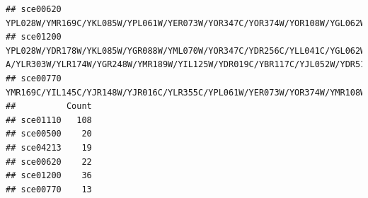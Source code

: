 \documentclass[
]{book}
\begin{document}
\begin{verbatim}
## sce00620                                                                                                                                                                                                                                                                                                                                                                                                                                                                                                                                                                                                                                                                                                                   YPL028W/YMR169C/YKL085W/YPL061W/YER073W/YOR347C/YOR374W/YOR108W/YGL062W/YML004C/YAL054C/YDL174C/YDL131W/YDR272W/YBR145W/YEL071W/YLR153C/YDL182W/YBL015W/YML054C/YGL256W/YDR533C
## sce01200                                                                                                                                                                                                                                                                                                                                                                                                                                                                                                                                                                                                 YPL028W/YDR178W/YKL085W/YGR088W/YML070W/YOR347C/YDR256C/YLL041C/YGL062W/YNR001C/YOR184W/YAL054C/YCR073W-A/YLR303W/YLR174W/YGR248W/YMR189W/YIL125W/YDR019C/YBR117C/YJL052W/YDR516C/YKL148C/YNR034W/YER081W/YLR153C/YBL068W/YFL030W/YDR148C/YGR205W/YKL141W/YGR256W/YFR053C/YDL021W/YOR136W/YCL040W
## sce00770                                                                                                                                                                                                                                                                                                                                                                                                                                                                                                                                                                                                                                                                                                                                                                                           YMR169C/YIL145C/YJR148W/YJR016C/YLR355C/YPL061W/YER073W/YOR374W/YMR108W/YHR063C/YGL154C/YHR208W/YMR020W
##          Count
## sce01110   108
## sce00500    20
## sce04213    19
## sce00620    22
## sce01200    36
## sce00770    13
\end{verbatim}
\end{document}
